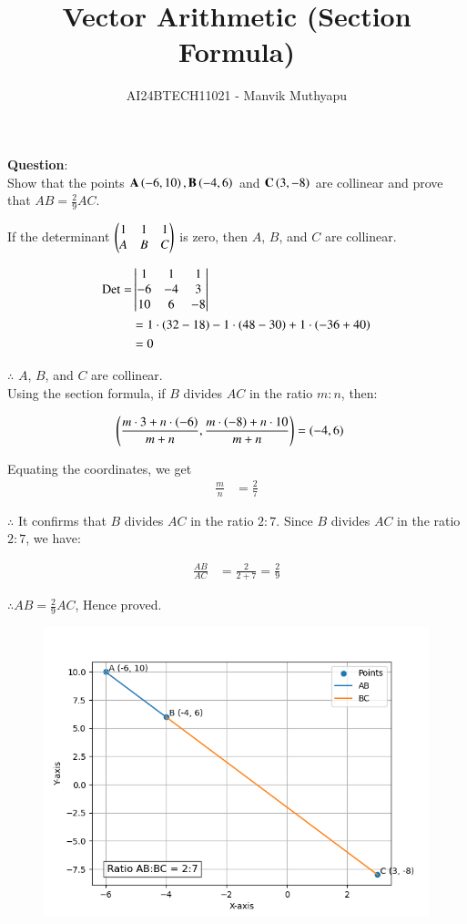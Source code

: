 \documentclass[journal,12pt,onecolumn]{IEEEtran}
\title{Vector Arithmetic (Section Formula)}
\author{AI24BTECH11021 - Manvik Muthyapu}
\theoremstyle{remark}
\begin{document}


\maketitle
\bigskip

\renewcommand{\thefigure}{\theenumi}
\renewcommand{\thetable}{\theenumi}


\textbf{Question}:\\

Show that the points $\textbf{A}\left(-6,10\right),\textbf{B}\left(-4,6\right)$ and $\textbf{C}\left(3,-8\right)$ are collinear and prove that $AB = \frac{2}{9}AC$.\\
		
\solution 

If the determinant 
$
\begin{pmatrix}
1 & 1 & 1 \\
A & B & C\end{pmatrix}
$
is zero, then $A$, $B$, and $C$ are collinear.

\begin{align}
	\text{Det} =&
	\begin{vmatrix}
1 & 1 & 1 \\
-6 & -4 & 3 \\
10 & 6 & -8
	\end{vmatrix} \\
&= 1 \cdot (32 - 18) - 1 \cdot (48 - 30) + 1 \cdot (-36 + 40) \\
&= 0
\end{align}

$\therefore$ $A$, $B$, and $C$ are collinear.\\

Using the section formula, if $B$ divides $AC$ in the ratio $m:n$, then:

\begin{align}
\left(\frac{m \cdot 3 + n \cdot (-6)}{m+n}, \frac{m \cdot (-8) + n \cdot 10}{m+n}\right) &= (-4, 6) 
\end{align}

Equating the coordinates, we get
\begin{align}
\frac{m}{n} &= \frac{2}{7}
\end{align}

$\therefore$ It confirms that $B$ divides $AC$ in the ratio $2:7$. Since $B$ divides $AC$ in the ratio $2:7$, we have:

\begin{align}
\frac{AB}{AC} &= \frac{2}{2+7} = \frac{2}{9}
\end{align}

$\therefore AB = \frac{2}{9} AC$, Hence proved.

\begin{figure}[h!]
	\centering
	\includegraphics[width=0.7\linewidth]{figs/fig1.png}
\end{figure}
\end{document}
